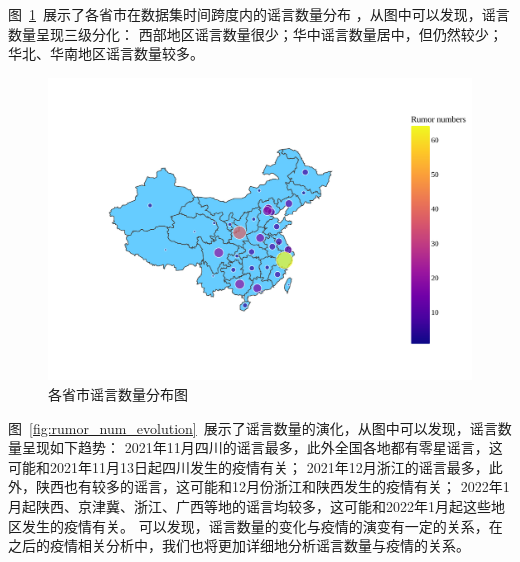 \documentclass[UTF8]{ctexart}
\begin{document}

图~\ref{fig:rumor_num_choropleth}~展示了各省市在数据集时间跨度内的谣言数量分布
，从图中可以发现，谣言数量呈现三级分化：
西部地区谣言数量很少；华中谣言数量居中，但仍然较少；华北、华南地区谣言数量较多。

\begin{figure}[!ht]
    \centering
    \includegraphics[width=0.6\linewidth]{../figures/rumor_num_choropleth}
    \caption{各省市谣言数量分布图}
    \label{fig:rumor_num_choropleth}
\end{figure}


图~\ref{fig:rumor_num_evolution}~展示了谣言数量的演化，从图中可以发现，谣言数量呈现如下趋势：
2021年11月四川的谣言最多，此外全国各地都有零星谣言，这可能和2021年11月13日起四川发生的疫情有关；
2021年12月浙江的谣言最多，此外，陕西也有较多的谣言，这可能和12月份浙江和陕西发生的疫情有关；
2022年1月起陕西、京津冀、浙江、广西等地的谣言均较多，这可能和2022年1月起这些地区发生的疫情有关。
可以发现，谣言数量的变化与疫情的演变有一定的关系，在之后的疫情相关分析中，我们也将更加详细地分析谣言数量与疫情的关系。
\end{document}
